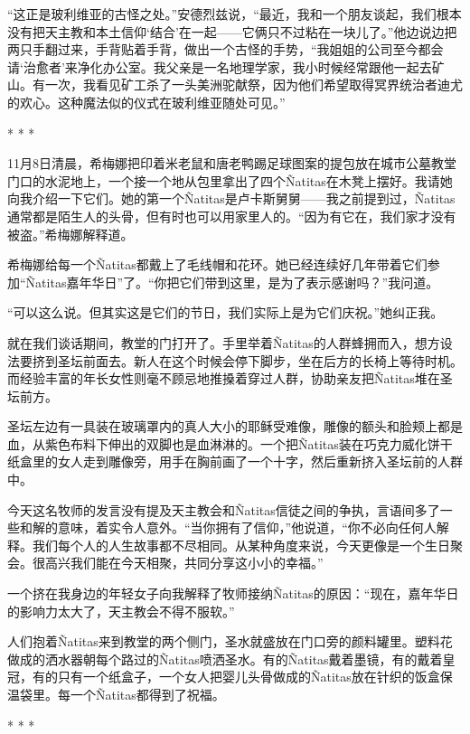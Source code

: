 \documentclass[12pt,oneside]{book}
\begin{document}
\begin{bookref}[frametitle={\cite{好好告别}}]
“这正是玻利维亚的古怪之处。”安德烈兹说，“最近，我和一个朋友谈起，我们根本没有把天主教和本土信仰‘结合’在一起——它俩只不过粘在一块儿了。”他边说边把两只手翻过来，手背贴着手背，做出一个古怪的手势，“我姐姐的公司至今都会请‘治愈者’来净化办公室。我父亲是一名地理学家，我小时候经常跟他一起去矿山。有一次，我看见矿工杀了一头美洲驼献祭，因为他们希望取得冥界统治者迪尤的欢心。这种魔法似的仪式在玻利维亚随处可见。”

\begin{center}
* * *
\end{center}

11月8日清晨，希梅娜把印着米老鼠和唐老鸭踢足球图案的提包放在城市公墓教堂门口的水泥地上，一个接一个地从包里拿出了四个Ñatitas在木凳上摆好。我请她向我介绍一下它们。她的第一个Ñatitas是卢卡斯舅舅——我之前提到过，Ñatitas通常都是陌生人的头骨，但有时也可以用家里人的。“因为有它在，我们家才没有被盗。”希梅娜解释道。

希梅娜给每一个Ñatitas都戴上了毛线帽和花环。她已经连续好几年带着它们参加“Ñatitas嘉年华日”了。“你把它们带到这里，是为了表示感谢吗？”我问道。

“可以这么说。但其实这是它们的节日，我们实际上是为它们庆祝。”她纠正我。

就在我们谈话期间，教堂的门打开了。手里举着Ñatitas的人群蜂拥而入，想方设法要挤到圣坛前面去。新人在这个时候会停下脚步，坐在后方的长椅上等待时机。而经验丰富的年长女性则毫不顾忌地推搡着穿过人群，协助亲友把Ñatitas堆在圣坛前方。

圣坛左边有一具装在玻璃罩内的真人大小的耶稣受难像，雕像的额头和脸颊上都是血，从紫色布料下伸出的双脚也是血淋淋的。一个把Ñatitas装在巧克力威化饼干纸盒里的女人走到雕像旁，用手在胸前画了一个十字，然后重新挤入圣坛前的人群中。

今天这名牧师的发言没有提及天主教会和Ñatitas信徒之间的争执，言语间多了一些和解的意味，着实令人意外。“当你拥有了信仰，”他说道，“你不必向任何人解释。我们每个人的人生故事都不尽相同。从某种角度来说，今天更像是一个生日聚会。很高兴我们能在今天相聚，共同分享这小小的幸福。”

一个挤在我身边的年轻女子向我解释了牧师接纳Ñatitas的原因：“现在，嘉年华日的影响力太大了，天主教会不得不服软。”

人们抱着Ñatitas来到教堂的两个侧门，圣水就盛放在门口旁的颜料罐里。塑料花做成的洒水器朝每个路过的Ñatitas喷洒圣水。有的Ñatitas戴着墨镜，有的戴着皇冠，有的只有一个纸盒子，一个女人把婴儿头骨做成的Ñatitas放在针织的饭盒保温袋里。每一个Ñatitas都得到了祝福。

\begin{center}
* * *
\end{center}


\end{bookref}
\end{document}
